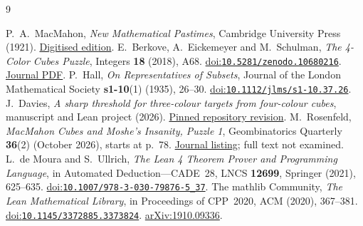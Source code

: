 \documentclass[11pt]{article}
\theoremstyle{remark}
\begin{document}
\begin{thebibliography}{9}
\raggedright
{} P.~A.~MacMahon,
\emph{New Mathematical Pastimes}, Cambridge University Press (1921).
\href{https://archive.org/details/newmathematicalp00macmuoft}{Digitised edition}.
 E.~Berkove, A.~Eickemeyer and M.~Schulman,
\emph{The 4-Color Cubes Puzzle}, Integers \textbf{18} (2018), A68.
\href{https://doi.org/10.5281/zenodo.10680216}{doi:\nolinkurl{10.5281/zenodo.10680216}}.
\href{https://math.colgate.edu/~integers/s68/s68.pdf}{Journal PDF}.
 P.~Hall, \emph{On Representatives of Subsets},
Journal of the London Mathematical Society \textbf{s1-10}(1) (1935), 26--30.
\href{https://doi.org/10.1112/jlms/s1-10.37.26}{doi:\nolinkurl{10.1112/jlms/s1-10.37.26}}.
 J.~Davies,
\emph{A sharp threshold for three-colour targets from four-colour cubes},
manuscript and Lean project (2026).
\href{https://github.com/jasondavies/macmahon-four-to-three/tree/6f5f04b28ac8d2156af66bbe060f2060b19b30a4}{Pinned repository revision}.
 M.~Rosenfeld,
\emph{MacMahon Cubes and Moshe's Insanity, Puzzle 1},
Geombinatorics Quarterly \textbf{36}(2) (October 2026), starts at p.~78.
\href{https://geombina.uccs.edu/past-issues/volume-xxxvi}{Journal listing};
full text not examined.
 L.~de Moura and S.~Ullrich,
\emph{The Lean 4 Theorem Prover and Programming Language},
in Automated Deduction---CADE~28, LNCS \textbf{12699}, Springer (2021), 625--635.
\href{https://doi.org/10.1007/978-3-030-79876-5_37}{doi:\nolinkurl{10.1007/978-3-030-79876-5_37}}.
 The mathlib Community, \emph{The Lean Mathematical Library},
in Proceedings of CPP~2020, ACM (2020), 367--381.
\href{https://doi.org/10.1145/3372885.3373824}{doi:\nolinkurl{10.1145/3372885.3373824}}.
\href{https://arxiv.org/abs/1910.09336}{arXiv:1910.09336}.
\end{thebibliography}
\end{document}
